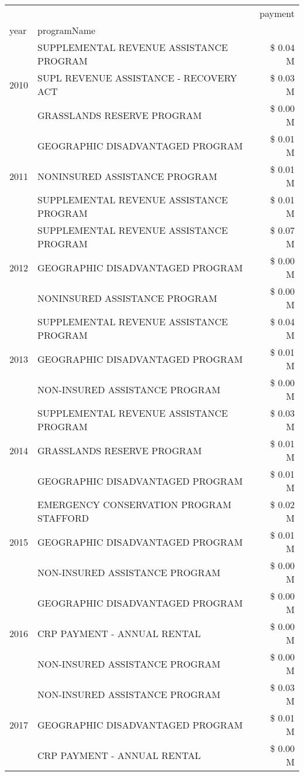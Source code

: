 \begin{tabular}{llr}
\toprule
 &  & payment \\
year & programName &  \\
\midrule
\multirow[t]{3}{*}{2010} & SUPPLEMENTAL REVENUE ASSISTANCE PROGRAM & \$ 0.04 M \\
 & SUPL REVENUE ASSISTANCE - RECOVERY ACT & \$ 0.03 M \\
 & GRASSLANDS RESERVE PROGRAM & \$ 0.00 M \\
\cline{1-3}
\multirow[t]{3}{*}{2011} & GEOGRAPHIC DISADVANTAGED PROGRAM & \$ 0.01 M \\
 & NONINSURED ASSISTANCE PROGRAM & \$ 0.01 M \\
 & SUPPLEMENTAL REVENUE ASSISTANCE PROGRAM & \$ 0.01 M \\
\cline{1-3}
\multirow[t]{3}{*}{2012} & SUPPLEMENTAL REVENUE ASSISTANCE PROGRAM & \$ 0.07 M \\
 & GEOGRAPHIC DISADVANTAGED PROGRAM & \$ 0.00 M \\
 & NONINSURED ASSISTANCE PROGRAM & \$ 0.00 M \\
\cline{1-3}
\multirow[t]{3}{*}{2013} & SUPPLEMENTAL REVENUE ASSISTANCE PROGRAM & \$ 0.04 M \\
 & GEOGRAPHIC DISADVANTAGED PROGRAM & \$ 0.01 M \\
 & NON-INSURED ASSISTANCE PROGRAM & \$ 0.00 M \\
\cline{1-3}
\multirow[t]{3}{*}{2014} & SUPPLEMENTAL REVENUE ASSISTANCE PROGRAM & \$ 0.03 M \\
 & GRASSLANDS RESERVE PROGRAM & \$ 0.01 M \\
 & GEOGRAPHIC DISADVANTAGED PROGRAM & \$ 0.01 M \\
\cline{1-3}
\multirow[t]{3}{*}{2015} & EMERGENCY CONSERVATION PROGRAM STAFFORD & \$ 0.02 M \\
 & GEOGRAPHIC DISADVANTAGED PROGRAM & \$ 0.01 M \\
 & NON-INSURED ASSISTANCE PROGRAM & \$ 0.00 M \\
\cline{1-3}
\multirow[t]{3}{*}{2016} & GEOGRAPHIC DISADVANTAGED PROGRAM & \$ 0.00 M \\
 & CRP PAYMENT - ANNUAL RENTAL & \$ 0.00 M \\
 & NON-INSURED ASSISTANCE PROGRAM & \$ 0.00 M \\
\cline{1-3}
\multirow[t]{3}{*}{2017} & NON-INSURED ASSISTANCE PROGRAM & \$ 0.03 M \\
 & GEOGRAPHIC DISADVANTAGED PROGRAM & \$ 0.01 M \\
 & CRP PAYMENT - ANNUAL RENTAL & \$ 0.00 M \\

\end{tabular}

